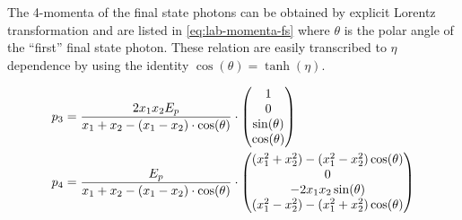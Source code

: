 \begin{wrapfigure}{R}{0.4\textwidth}
\centering
{}
\end{wrapfigure}
The 4-momenta of the final state photons can be obtained by explicit
Lorentz transformation and are listed in \cref{eq:lab-momenta-fs}
where \(\theta\) is the polar angle of the ``first'' final state
photon.  These relation are easily transcribed to \(\eta\) dependence
by using the identity \(\cos(\theta) = \tanh(\eta)\).


\begin{align}
  \label{eq:lab-momenta-fs}
  p_3 &= \frac{2x_1x_2E_p}{x_1+x_2 - (x_1 - x_2)\cdot\cos(\theta)}\cdot
  \mqty(1 \\ 0 \\ \sin(\theta) \\ \cos(\theta)) \\
  p_4 &= \frac{E_p}{x_1+x_2 - (x_1 - x_2)\cdot\cos(\theta)}\cdot
  \mqty((x_1^2+x_2^2) - (x_1^2-x_2^2)\cos(\theta) \\ 0 \\ -2x_1x_2\sin(\theta) \\ (x_1^2-x_2^2) - (x_1^2+x_2^2)\cos(\theta))
\end{align}

